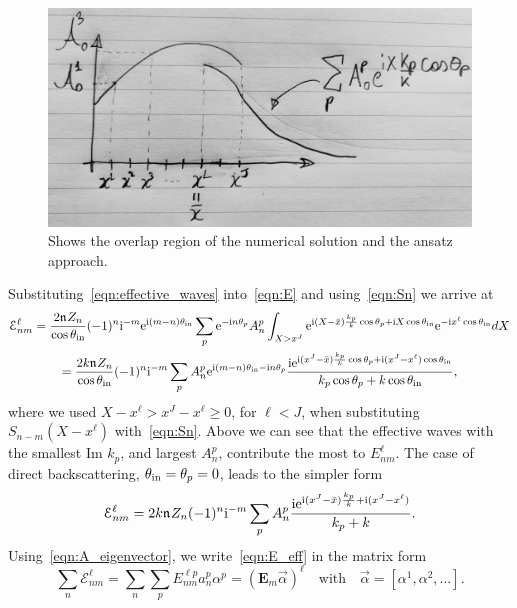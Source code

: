 \documentclass[12pt, a4paper]{article}
\begin{document}
\begin{figure}
  \centering
  \includegraphics[width=0.8\linewidth]{connect_effective.jpg}
  \caption{Shows the overlap region of the numerical solution and the ansatz approach.}
  \label{fig:connect_effective}
\end{figure}

 Substituting~\eqref{eqn:effective_waves} into~\eqref{eqn:E} and using~\eqref{eqn:Sn} we arrive at
\begin{multline}
  \mathcal E_{nm}^\ell  = \frac{2 \mathfrak n_{} Z_n}{\cos \theta_{\mathrm{in}}} (-1)^n \textrm{i}^{-m} \textrm{e}^{\textrm{i} (m-n) \theta_{\mathrm{in}}}
   \sum_p \textrm{e}^{-\textrm{i} n \theta_p} A_{n}^p \int_{X> x^J} \textrm{e}^{\textrm{i} (X - \bar x)\frac{k_p}{k} \cos \theta_p +  \textrm{i} X\cos \theta_{\mathrm{in}}}
  \textrm{e}^{- \textrm{i} x^\ell\cos \theta_{\mathrm{in}}}
   dX
   \\
   = \frac{2 k \mathfrak n_{} Z_n }{\cos \theta_{\mathrm{in}}} (-1)^n \textrm{i}^{-m}
    \sum_p A_{n}^p \textrm{e}^{\textrm{i} (m-n) \theta_{\mathrm{in}} - \textrm{i} n \theta_p}
    \frac{\textrm{i} \textrm{e}^{  \textrm{i} (x^J - \bar x)\frac{k_p}{k}  \cos \theta_p  + \textrm{i}  (x^J - x^\ell) \cos \theta_{\mathrm{in}} }}
    {k_p \cos \theta_p + k\cos \theta_{\mathrm{in}}},
    \label{eqn:E_eff}
\end{multline}
where we used $ X -x^\ell > x^J - x^\ell \geq 0$, for $\ell < J$, when substituting $S_{n-m}(X-x^\ell)$ with~\eqref{eqn:Sn}. Above we can see that the effective waves with the smallest Im $k_p$, and largest $A_n^p$, contribute the most to $E_{nm}^\ell$. The case of direct backscattering, $\theta_{\mathrm{in}} = \theta_p =0$, leads to the simpler form
\begin{equation}
  \mathcal E_{nm}^\ell = 2 k \mathfrak n_{} Z_n (-1)^n \textrm{i}^{-m}
    \sum_p A_{n}^p
    \frac{\textrm{i}  \textrm{e}^{  \textrm{i} (x^J - \bar x)\frac{k_p}{k}  + \textrm{i}  (x^J - x^\ell) }}{k_p + k}.
    \label{eqn:E_eff_direct}
\end{equation}
Using~\eqref{eqn:A_eigenvector}, we write~\eqref{eqn:E_eff} in the matrix form
\begin{equation}
  \sum_n \mathcal E_{nm}^\ell =  \sum_n\sum_p  E_{nm}^{\ell p} a_{n}^p \alpha^p = (\mathbf E_m \vec \alpha)^\ell \quad \text{with} \quad
  \vec \alpha = [\alpha^1, \alpha^2, \ldots].
    \label{eqn:E_eff_matrix}
\end{equation}
\end{document}
